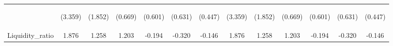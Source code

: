 \documentclass[]{article}
\begin{document}
\begin{center}
\begin{tabular}{lcccccccccccc}
\vspace{4pt} & \begin{footnotesize}(3.359)\end{footnotesize} & \begin{footnotesize}(1.852)\end{footnotesize} & \begin{footnotesize}(0.669)\end{footnotesize} & \begin{footnotesize}(0.601)\end{footnotesize} & \begin{footnotesize}(0.631)\end{footnotesize} & \begin{footnotesize}(0.447)\end{footnotesize} & \begin{footnotesize}(3.359)\end{footnotesize} & \begin{footnotesize}(1.852)\end{footnotesize} & \begin{footnotesize}(0.669)\end{footnotesize} & \begin{footnotesize}(0.601)\end{footnotesize} & \begin{footnotesize}(0.631)\end{footnotesize} & \begin{footnotesize}(0.447)\end{footnotesize} \\
Liquidity\_ratio & 1.876 & 1.258 & 1.203 & -0.194 & -0.320 & -0.146 & 1.876 & 1.258 & 1.203 & -0.194 & -0.320 & -0.146 \\

\end{tabular}
\end{center}
\end{document}
